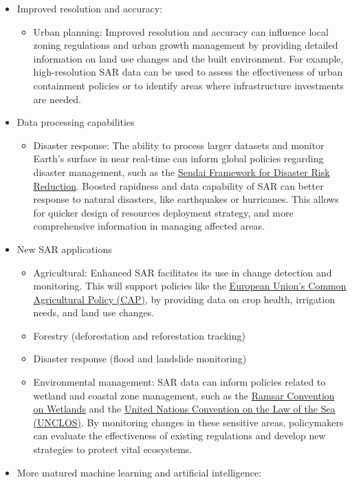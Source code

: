 \documentclass[
  letterpaper,
  DIV=11,
  numbers=noendperiod]{scrreprt}
\providecommand{\tightlist}{%
  \setlength{\itemsep}{0pt}\setlength{\parskip}{0pt}}\usepackage{longtable,booktabs,array}
\begin{document}
\begin{itemize}
\item
  Improved resolution and accuracy:

  \begin{itemize}
  \tightlist
  \item
    Urban planning: Improved resolution and accuracy can influence local
    zoning regulations and urban growth management by providing detailed
    information on land use changes and the built environment. For
    example, high-resolution SAR data can be used to assess the
    effectiveness of urban containment policies or to identify areas
    where infrastructure investments are needed.
  \end{itemize}
\item
  Data processing capabilities

  \begin{itemize}
  \tightlist
  \item
    Disaster response: The ability to process larger datasets and
    monitor Earth's surface in near real-time can inform global policies
    regarding disaster management, such as the
    \href{https://www.undrr.org/implementing-sendai-framework/what-sendai-framework}{Sendai
    Framework for Disaster Risk Reduction}. Boosted rapidness and data
    capability of SAR can better response to natural disasters, like
    earthquakes or hurricanes. This allows for quicker design of
    resources deployment strategy, and more comprehensive information in
    managing affected areas.
  \end{itemize}
\item
  New SAR applications

  \begin{itemize}
  \tightlist
  \item
    Agricultural: Enhanced SAR facilitates its use in change detection
    and monitoring. This will support policies like the
    \href{https://ec.europa.eu/info/food-farming-fisheries/key-policies/common-agricultural-policy/cap-glance_en}{European
    Union's Common Agricultural Policy (CAP)}, by providing data on crop
    health, irrigation needs, and land use changes.
  \item
    Forestry (deforestation and reforestation tracking)
  \item
    Disaster response (flood and landslide monitoring)
  \item
    Environmental management: SAR data can inform policies related to
    wetland and coastal zone management, such as the
    \href{https://www.ramsar.org/}{Ramsar Convention on Wetlands} and
    the
    \href{https://www.un.org/Depts/los/convention_agreements/convention_overview_convention.htm}{United
    Nations Convention on the Law of the Sea (UNCLOS)}. By monitoring
    changes in these sensitive areas, policymakers can evaluate the
    effectiveness of existing regulations and develop new strategies to
    protect vital ecosystems.
  \end{itemize}
\item
  More matured machine learning and artificial intelligence:


\end{itemize}
\end{document}
